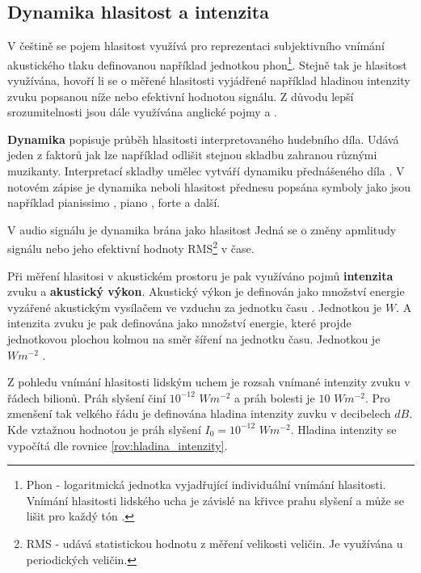   \subsection{Dynamika hlasitost a intenzita} \label{sec:Dynamika}
  

  V češtině se pojem hlasitost využívá pro reprezentaci subjektivního vnímání akustického tlaku definovanou například jednotkou phon\footnote{Phon - logaritmická jednotka vyjadřující individuální vnímání hlasitosti. Vnímání hlasitosti lidského ucha je závislé na křivce prahu slyšení a může se lišit pro každý tón \cite{tumarkin_1950}.}. 
  Stejně tak je hlasitost využívána, hovoří li se o měřené hlasitosti vyjádřené například hladinou intenzity zvuku popsanou níže nebo efektivní hodnotou signálu.
  Z důvodu lepší srozumitelnosti jsou dále využívána anglické pojmy  a . 
  
  \textbf{Dynamika} popisuje průběh hlasitosti  interpretovaného hudebního díla. Udává jeden z faktorů jak lze například odlišit stejnou skladbu zahranou různými muzikanty. Interpretací skladby umělec vytváří dynamiku přednášeného díla \cite{fundamental_of_music_processing}.
  V notovém zápise je dynamika neboli hlasitost přednesu popsána symboly jako jsou například pianissimo , piano , forte  a další.

  V audio signálu je dynamika brána jako hlasitost  Jedná se o změny apmlitudy signálu nebo jeho efektivní hodnoty \acs{RMS}\footnote{RMS - udává statistickou hodnotu z měření velikosti veličin. Je využívána u periodických veličin\cite{RMS_value}.} v čase.

  Při měření hlasitosi  v akustickém prostoru je pak využíváno pojmů \textbf{intenzita} zvuku a \textbf{akustický výkon}.
  Akustický výkon je definován jako množství energie  vyzářené akustickým vysílačem ve vzduchu za jednotku času \cite{acoustic_power}. Jednotkou je $W$.
  A intenzita zvuku je pak definována jako množství energie, které projde jednotkovou plochou kolmou na směr šíření na jednotku času. Jednotkou je $Wm^{-2}$ \cite{intenzita_zvuku_definice}.
  
  Z pohledu vnímání hlasitosti lidským uchem je rozsah vnímané intenzity zvuku v řádech bilionů. Práh slyšení činí $10^{-12}$ $Wm^{-2}$ a práh bolesti je $10$ $Wm^{-2}$.
  Pro zmenšení tak velkého řádu je definována hladina intenzity zuvku v decibelech $dB$. Kde vztažnou hodnotou je práh slyšení $I_0 = 10^{-12}$ $Wm^{-2}$.
  Hladina intenzity se vypočítá dle rovnice \ref{rov:hladina_intenzity}.

